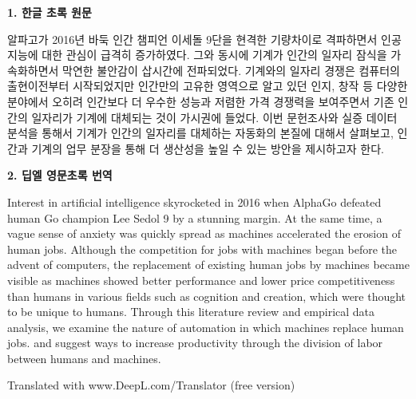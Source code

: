 \documentclass[
  letterpaper,
]{book}
\begin{document}
\begin{tcolorbox}[enhanced jigsaw, opacityback=0, bottomrule=.15mm, breakable, arc=.35mm, rightrule=.15mm, leftrule=.75mm, toprule=.15mm, left=2mm, colframe=quarto-callout-tip-color-frame, colback=white]
\begin{minipage}[t]{5.5mm}
\textcolor{quarto-callout-tip-color}{\faLightbulb}
\end{minipage}%
\begin{minipage}[t]{\textwidth - 5.5mm}

\textbf{1. 한글 초록 원문}\vspace{2mm}

알파고가 2016년 바둑 인간 챔피언 이세돌 9단을 현격한 기량차이로
격파하면서 인공지능에 대한 관심이 급격히 증가하였다. 그와 동시에 기계가
인간의 일자리 잠식을 가속화하면서 막연한 불안감이 삽시간에 전파되었다.
기계와의 일자리 경쟁은 컴퓨터의 출현이전부터 시작되었지만 인간만의
고유한 영역으로 알고 있던 인지, 창작 등 다양한 분야에서 오히려 인간보다
더 우수한 성능과 저렴한 가격 경쟁력을 보여주면서 기존 인간의 일자리가
기계에 대체되는 것이 가시권에 들었다. 이번 문헌조사와 실증 데이터 분석을
통해서 기계가 인간의 일자리를 대체하는 자동화의 본질에 대해서 살펴보고,
인간과 기계의 업무 분장을 통해 더 생산성을 높일 수 있는 방안을
제시하고자 한다.

\end{minipage}%
\end{tcolorbox}

\begin{tcolorbox}[enhanced jigsaw, opacityback=0, bottomrule=.15mm, breakable, arc=.35mm, rightrule=.15mm, leftrule=.75mm, toprule=.15mm, left=2mm, colframe=quarto-callout-tip-color-frame, colback=white]
\begin{minipage}[t]{5.5mm}
\textcolor{quarto-callout-tip-color}{\faLightbulb}
\end{minipage}%
\begin{minipage}[t]{\textwidth - 5.5mm}

\textbf{2. 딥엘 영문초록 번역}\vspace{2mm}

Interest in artificial intelligence skyrocketed in 2016 when AlphaGo
defeated human Go champion Lee Sedol 9 by a stunning margin. At the same
time, a vague sense of anxiety was quickly spread as machines
accelerated the erosion of human jobs. Although the competition for jobs
with machines began before the advent of computers, the replacement of
existing human jobs by machines became visible as machines showed better
performance and lower price competitiveness than humans in various
fields such as cognition and creation, which were thought to be unique
to humans. Through this literature review and empirical data analysis,
we examine the nature of automation in which machines replace human
jobs. and suggest ways to increase productivity through the division of
labor between humans and machines.

Translated with www.DeepL.com/Translator (free version)

\end{minipage}%
\end{tcolorbox}
\end{document}
